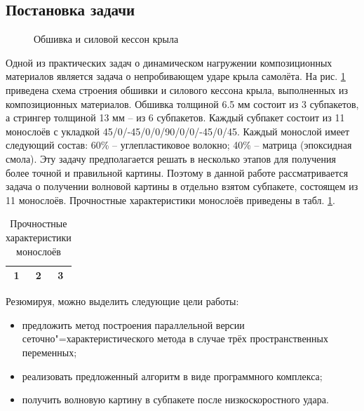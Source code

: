 \subsection*{Постановка задачи}
\begin{figure}[h]
\caption{Обшивка и силовой кессон крыла}
\label{pic:construction}
\end{figure}
Одной из практических задач о динамическом нагружении композиционных материалов является задача о непробивающем ударе крыла самолёта. На рис. \ref{pic:construction} приведена схема строения обшивки и силового кессона крыла, выполненных из композиционных материалов. Обшивка толщиной 6.5 мм состоит из 3 субпакетов, а стрингер толщиной 13 мм -- из 6 субпакетов. Каждый субпакет состоит из 11 монослоёв с укладкой 45/0/-45/0/0/90/0/0/-45/0/45. Каждый монослой  имеет следующий состав: 60\% -- углепластиковое волокно; 40\% -- матрица (эпоксидная смола).
Эту задачу предполагается решать в несколько этапов для получения более точной и правильной картины. Поэтому в данной работе рассматривается задача о получении волновой картины в отдельно взятом субпакете, состоящем из 11 монослоёв. Прочностные характеристики монослоёв приведены в табл. \ref{tbl:monolayer}.
\newpage
\begin{table}
\centering
\begin{tabular}{|c|c|c|}
\hline
1 & 2 & 3 \\ 
\hline
\end{tabular}
\caption{Прочностные характеристики монослоёв}
\label{tbl:monolayer}
\end{table}

Резюмируя, можно выделить следующие цели работы:
\begin{itemize}
\item предложить метод построения параллельной версии сеточно"=характеристического метода в случае трёх пространственных переменных;
\item реализовать предложенный алгоритм в виде программного комплекса;
\item получить волновую картину в субпакете после низкоскоростного удара.
\end{itemize}

